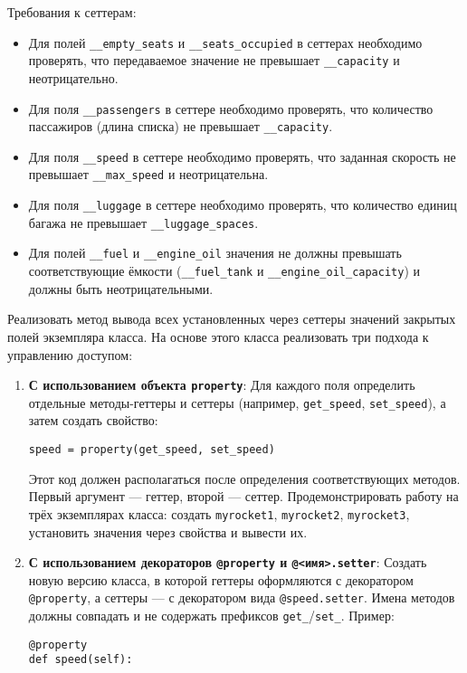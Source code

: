 \begin{enumerate}
Требования к сеттерам:
\begin{itemize}
    \item Для полей \texttt{\_\_empty\_seats} и \texttt{\_\_seats\_occupied} в сеттерах необходимо проверять, что передаваемое значение не превышает \texttt{\_\_capacity} и неотрицательно.  
    \item Для поля \texttt{\_\_passengers} в сеттере необходимо проверять, что количество пассажиров (длина списка) не превышает \texttt{\_\_capacity}.  
    \item Для поля \texttt{\_\_speed} в сеттере необходимо проверять, что заданная скорость не превышает \texttt{\_\_max\_speed} и неотрицательна.  
    \item Для поля \texttt{\_\_luggage} в сеттере необходимо проверять, что количество единиц багажа не превышает \texttt{\_\_luggage\_spaces}.
    \item Для полей \texttt{\_\_fuel} и \texttt{\_\_engine\_oil} значения не должны превышать соответствующие ёмкости (\texttt{\_\_fuel\_tank} и \texttt{\_\_engine\_oil\_capacity}) и должны быть неотрицательными.
\end{itemize}
Реализовать метод вывода всех установленных через сеттеры значений закрытых полей экземпляра класса.
На основе этого класса реализовать три подхода к управлению доступом:
\begin{enumerate}
    \item \textbf{С использованием объекта \texttt{property}}:  
    Для каждого поля определить отдельные методы-геттеры и сеттеры (например, \texttt{get\_speed}, \texttt{set\_speed}), а затем создать свойство:  
    \begin{verbatim}
speed = property(get_speed, set_speed)
    \end{verbatim}  
    Этот код должен располагаться после определения соответствующих методов. Первый аргумент — геттер, второй — сеттер.  
    Продемонстрировать работу на трёх экземплярах класса: создать \texttt{myrocket1}, \texttt{myrocket2}, \texttt{myrocket3}, установить значения через свойства и вывести их.
    \item \textbf{С использованием декораторов \texttt{@property} и \texttt{@<имя>.setter}}:  
    Создать новую версию класса, в которой геттеры оформляются с декоратором \texttt{@property}, а сеттеры — с декоратором вида \texttt{@speed.setter}. Имена методов должны совпадать и не содержать префиксов \texttt{get\_}/\texttt{set\_}.  
    Пример:  
    \begin{verbatim}
@property
def speed(self):

\end{verbatim}
\end{enumerate}
\end{enumerate}
